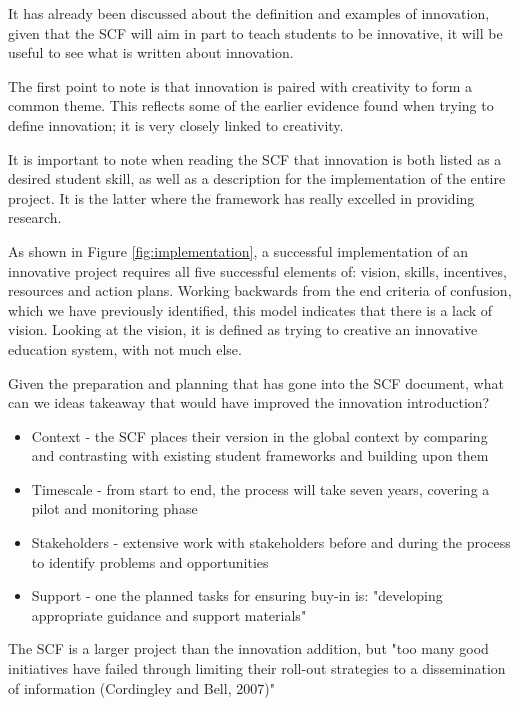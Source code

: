 It has already been discussed about the definition and examples of innovation, given that the SCF will aim in part to teach students to be innovative, it will be useful to see what is written about innovation.

The first point to note is that innovation is paired with creativity to form a common theme. This reflects some of the earlier evidence found when trying to define innovation; it is very closely linked to creativity.

It is important to note when reading the SCF that innovation is both listed as a desired student skill, as well as a description for the implementation of the entire project. It is the latter where the framework has really excelled in providing research.

As shown in Figure \ref{fig:implementation}, a successful implementation of an innovative project requires all five successful elements of: vision, skills, incentives, resources and action plans. Working backwards from the end criteria of confusion, which we have previously identified, this model indicates that there is a lack of vision. Looking at the vision, it is defined as trying to creative an innovative education system, with not much else.

Given the preparation and planning that has gone into the SCF document, what can we ideas takeaway that would have improved the innovation introduction?

\begin{itemize}
\item Context - the SCF places their version in the global context by comparing and contrasting with existing student frameworks and building upon them
\item Timescale - from start to end, the process will take seven years, covering a pilot and monitoring phase
\item Stakeholders - extensive work with stakeholders before and during the process to identify problems and opportunities
\item Support - one the planned tasks for ensuring buy-in is: "developing appropriate guidance and support materials"
\end{itemize}

The SCF is a larger project than the innovation addition, but "too many good initiatives have failed through limiting their roll-out strategies to a dissemination of information (Cordingley and Bell, 2007)" \cite{ADEC2016}
